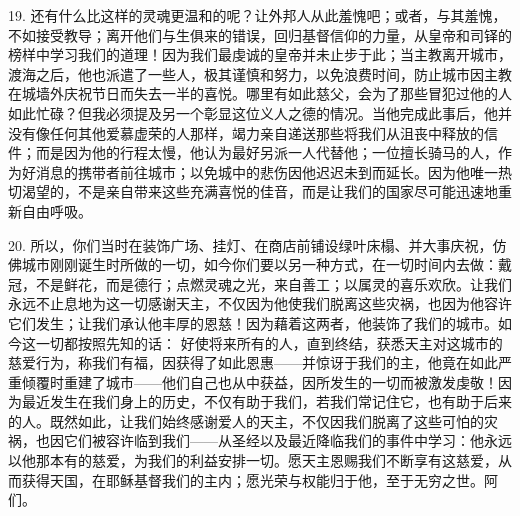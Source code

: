 19. 还有什么比这样的灵魂更温和的呢？让外邦人从此羞愧吧；或者，与其羞愧，不如接受教导；离开他们与生俱来的错误，回归基督信仰的力量，从皇帝和司铎的榜样中学习我们的道理！因为我们最虔诚的皇帝并未止步于此；当主教离开城市，渡海之后，他也派遣了一些人，极其谨慎和努力，以免浪费时间，防止城市因主教在城墙外庆祝节日而失去一半的喜悦。哪里有如此慈父，会为了那些冒犯过他的人如此忙碌？但我必须提及另一个彰显这位义人之德的情况。当他完成此事后，他并没有像任何其他爱慕虚荣的人那样，竭力亲自递送那些将我们从沮丧中释放的信件；而是因为他的行程太慢，他认为最好另派一人代替他；一位擅长骑马的人，作为好消息的携带者前往城市；以免城中的悲伤因他迟迟未到而延长。因为他唯一热切渴望的，不是亲自带来这些充满喜悦的佳音，而是让我们的国家尽可能迅速地重新自由呼吸。\par

20. 所以，你们当时在装饰广场、挂灯、在商店前铺设绿叶床榻、并大事庆祝，仿佛城市刚刚诞生时所做的一切，如今你们要以另一种方式，在一切时间内去做：戴冠，不是鲜花，而是德行；点燃灵魂之光，来自善工；以属灵的喜乐欢欣。让我们永远不止息地为这一切感谢天主，不仅因为他使我们脱离这些灾祸，也因为他容许它们发生；让我们承认他丰厚的恩慈！因为藉着这两者，他装饰了我们的城市。如今这一切都按照先知的话： 好使将来所有的人，直到终结，获悉天主对这城市的慈爱行为，称我们有福，因获得了如此恩惠——并惊讶于我们的主，他竟在如此严重倾覆时重建了城市——他们自己也从中获益，因所发生的一切而被激发虔敬！因为最近发生在我们身上的历史，不仅有助于我们，若我们常记住它，也有助于后来的人。既然如此，让我们始终感谢爱人的天主，不仅因我们脱离了这些可怕的灾祸，也因它们被容许临到我们——从圣经以及最近降临我们的事件中学习：他永远以他那本有的慈爱，为我们的利益安排一切。愿天主恩赐我们不断享有这慈爱，从而获得天国，在耶稣基督我们的主内；愿光荣与权能归于他，至于无穷之世。阿们。\par

